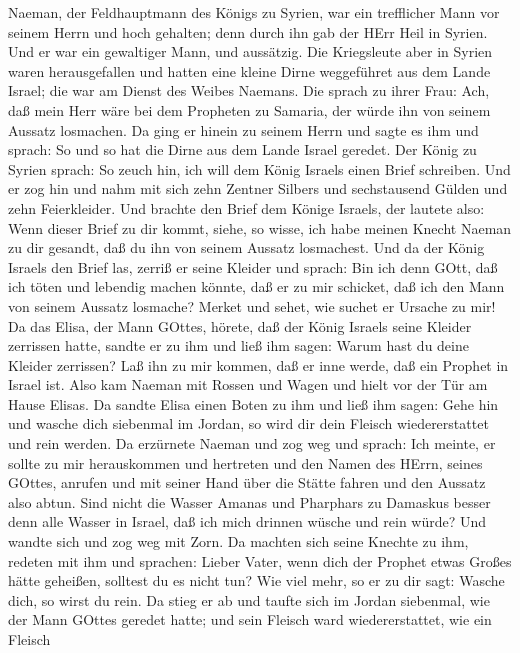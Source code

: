  Naeman, der Feldhauptmann des Königs zu Syrien, war ein
trefflicher Mann vor seinem Herrn und hoch gehalten; denn durch ihn gab
der HErr Heil in Syrien. Und er war ein gewaltiger Mann, und aussätzig.
 Die Kriegsleute aber in Syrien waren herausgefallen und
hatten eine kleine Dirne weggeführet aus dem Lande Israel; die war am
Dienst des Weibes Naemans.  Die sprach zu ihrer Frau: Ach,
daß mein Herr wäre bei dem Propheten zu Samaria, der würde ihn von
seinem Aussatz losmachen.  Da ging er hinein zu seinem Herrn
und sagte es ihm und sprach: So und so hat die Dirne aus dem Lande
Israel geredet.  Der König zu Syrien sprach: So zeuch hin,
ich will dem König Israels einen Brief schreiben. Und er zog hin und
nahm mit sich zehn Zentner Silbers und sechstausend Gülden und zehn
Feierkleider.  Und brachte den Brief dem Könige Israels, der
lautete also: Wenn dieser Brief zu dir kommt, siehe, so wisse, ich habe
meinen Knecht Naeman zu dir gesandt, daß du ihn von seinem Aussatz
losmachest.  Und da der König Israels den Brief las, zerriß
er seine Kleider und sprach: Bin ich denn GOtt, daß ich töten und
lebendig machen könnte, daß er zu mir schicket, daß ich den Mann von
seinem Aussatz losmache? Merket und sehet, wie suchet er Ursache zu mir!
 Da das Elisa, der Mann GOttes, hörete, daß der König
Israels seine Kleider zerrissen hatte, sandte er zu ihm und ließ ihm
sagen: Warum hast du deine Kleider zerrissen? Laß ihn zu mir kommen, daß
er inne werde, daß ein Prophet in Israel ist.  Also kam
Naeman mit Rossen und Wagen und hielt vor der Tür am Hause Elisas.
 Da sandte Elisa einen Boten zu ihm und ließ ihm sagen:
Gehe hin und wasche dich siebenmal im Jordan, so wird dir dein Fleisch
wiedererstattet und rein werden.  Da erzürnete Naeman und
zog weg und sprach: Ich meinte, er sollte zu mir herauskommen und
hertreten und den Namen des HErrn, seines GOttes, anrufen und mit seiner
Hand über die Stätte fahren und den Aussatz also abtun. 
Sind nicht die Wasser Amanas und Pharphars zu Damaskus besser denn alle
Wasser in Israel, daß ich mich drinnen wüsche und rein würde? Und wandte
sich und zog weg mit Zorn.  Da machten sich seine Knechte
zu ihm, redeten mit ihm und sprachen: Lieber Vater, wenn dich der
Prophet etwas Großes hätte geheißen, solltest du es nicht tun? Wie viel
mehr, so er zu dir sagt: Wasche dich, so wirst du rein.  Da
stieg er ab und taufte sich im Jordan siebenmal, wie der Mann GOttes
geredet hatte; und sein Fleisch ward wiedererstattet, wie ein Fleisch
